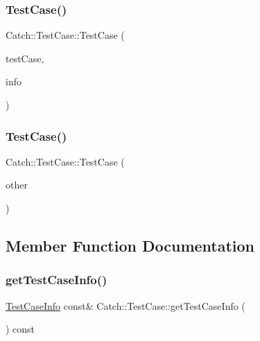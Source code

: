 \subsubsection{\texorpdfstring{Test\+Case()}{TestCase()}\hspace{0.1cm}{\footnotesize\ttfamily [1/2]}}
{\footnotesize\ttfamily Catch\+::\+Test\+Case\+::\+Test\+Case (\begin{DoxyParamCaption}\item[{\hyperlink{struct_catch_1_1_i_test_case}{I\+Test\+Case} $\ast$}]{test\+Case,  }\item[{\hyperlink{struct_catch_1_1_test_case_info}{Test\+Case\+Info} const \&}]{info }\end{DoxyParamCaption})}

\hypertarget{class_catch_1_1_test_case_ac0011d3789edc3e44edb41f13c4775a0}{}\label{class_catch_1_1_test_case_ac0011d3789edc3e44edb41f13c4775a0} 
\subsubsection{\texorpdfstring{Test\+Case()}{TestCase()}\hspace{0.1cm}{\footnotesize\ttfamily [2/2]}}
{\footnotesize\ttfamily Catch\+::\+Test\+Case\+::\+Test\+Case (\begin{DoxyParamCaption}\item[{\hyperlink{class_catch_1_1_test_case}{Test\+Case} const \&}]{other }\end{DoxyParamCaption})}



\subsection{Member Function Documentation}
\hypertarget{class_catch_1_1_test_case_a1ea0d79f49156cebea076fe1ba50d2b6}{}\label{class_catch_1_1_test_case_a1ea0d79f49156cebea076fe1ba50d2b6} 
\subsubsection{\texorpdfstring{get\+Test\+Case\+Info()}{getTestCaseInfo()}}
{\footnotesize\ttfamily \hyperlink{struct_catch_1_1_test_case_info}{Test\+Case\+Info} const\& Catch\+::\+Test\+Case\+::get\+Test\+Case\+Info (\begin{DoxyParamCaption}{ }\end{DoxyParamCaption}) const}

